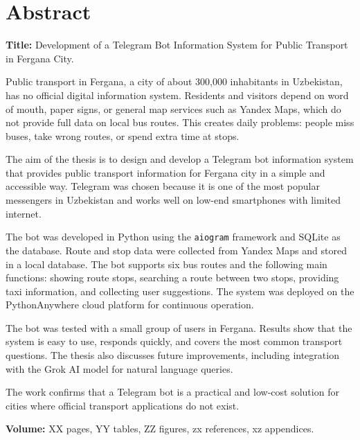 \section*{Abstract}

\textbf{Title:} Development of a Telegram Bot Information System for
Public Transport in Fergana City.

\medskip

Public transport in Fergana, a city of about 300{,}000 inhabitants in
Uzbekistan, has no official digital information system. Residents and
visitors depend on word of mouth, paper signs, or general map services
such as Yandex Maps, which do not provide full data on local bus routes.
This creates daily problems: people miss buses, take wrong routes, or
spend extra time at stops.

The aim of the thesis is to design and develop a Telegram bot
information system that provides public transport information for
Fergana city in a simple and accessible way. Telegram was chosen because
it is one of the most popular messengers in Uzbekistan and works well
on low-end smartphones with limited internet.

The bot was developed in Python using the \texttt{aiogram} framework
and SQLite as the database. Route and stop data were collected from
Yandex Maps and stored in a local database. The bot supports six bus
routes and the following main functions: showing route stops, searching
a route between two stops, providing taxi information, and collecting
user suggestions. The system was deployed on the PythonAnywhere cloud
platform for continuous operation.

The bot was tested with a small group of users in Fergana. Results show
that the system is easy to use, responds quickly, and covers the most
common transport questions. The thesis also discusses future
improvements, including integration with the Grok AI model for natural
language queries.

The work confirms that a Telegram bot is a practical and low-cost
solution for cities where official transport applications do not exist.

\medskip

\noindent\textbf{Volume:} XX pages, YY tables, ZZ figures,
zx references, xz appendices.
\newpage
